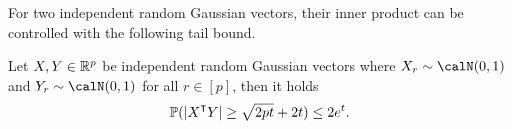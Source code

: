 


For two independent random Gaussian vectors, their inner product can be controlled with the following tail bound.
\begin{theorem}\label{thm:inner-product-tail}
    Let $X,Y\in{\mathbb{R}^{p}}$ be independent random Gaussian vectors where $X_r\sim\calN(0,1)$ and $Y_r\sim\calN(0,1)$ for all $r\in[p]$, then it holds
    \begin{align*}
        \prob(|X\transpose Y| \geq \sqrt{2pt} + 2t) \leq 2e^t.
    \end{align*}
\end{theorem}

